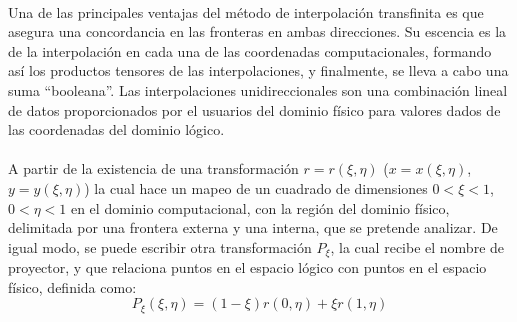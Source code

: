 \documentclass[letterpaper, openright, 12pt]{book}
\begin{document}
    \paragraph*{}
    Una de las principales ventajas del método de interpolación transfinita
    es que asegura una concordancia en las fronteras en ambas direcciones.
    Su escencia es la de la interpolación en cada una de las coordenadas
    computacionales, formando así los productos tensores de las
    interpolaciones, y finalmente, se lleva a cabo una suma ``booleana''.
    Las interpolaciones unidireccionales son una combinación lineal de datos
    proporcionados por el usuarios del dominio físico para valores dados de
    las coordenadas del dominio lógico.

    \paragraph*{}
    A partir de la existencia de una transformación $r = r(\xi, \eta)$
    ($x = x(\xi, \eta)$, $y = y(\xi, \eta)$) la cual hace un mapeo de un
    cuadrado de dimensiones $0 < \xi < 1$, $0 < \eta < 1$ en el dominio
    computacional, con la región del dominio físico, delimitada por una
    frontera externa y una interna, que se pretende analizar.
    De igual modo, se puede escribir otra transformación $P_{\xi}$,
    la cual recibe el nombre de proyector, y que relaciona puntos en el
    espacio lógico con puntos en el espacio físico, definida como:
    \begin{equation}
        P_{\xi}(\xi, \eta) = (1 - \xi)r(0, \eta) + \xi r(1, \eta)
    \end{equation}
\end{document}
